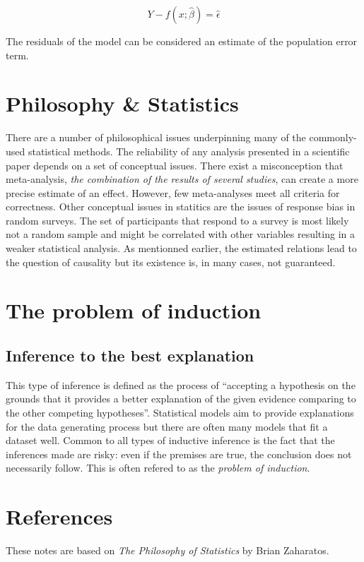 \documentclass{article}
\begin{document}
$$
    Y - f(x; \hat{\beta}) = \hat{\epsilon}
$$

The residuals of the model can be considered an estimate of the population error term.

\section{Philosophy \& Statistics}

There are a number of philosophical issues underpinning many of the commonly-used
statistical methods. The reliability of any analysis presented in a scientific paper
depends on a set of conceptual issues. There exist a misconception that meta-analysis,
\textit{the combination of the results of several studies}, can create a more precise
estimate of an effect. However, few meta-analyses meet all criteria for correctness.
Other conceptual issues in statitics are the issues of response bias in random surveys.
The set of participants that respond to a survey is most likely not a random sample and
might be correlated with other variables resulting in a weaker statistical analysis. As
mentionned earlier, the estimated relations lead to the question of causality but its
existence is, in many cases, not guaranteed.

\section{The problem of induction}
\subsection{Inference to the best explanation}

This type of inference is defined as the  process of “accepting a hypothesis on the
grounds that it provides a better explanation of the given evidence comparing to
the other competing hypotheses”. Statistical models aim to provide explanations for
the data generating process but there are often many models that fit a dataset well.
Common to all types of inductive inference is the fact that the inferences made are
risky: even if the premises are true, the conclusion does not necessarily follow.
This is often refered to as the \textit{problem of induction}.




\section{References}

These notes are based on \textit{The Philosophy of Statistics} by Brian Zaharatos.
\end{document}
